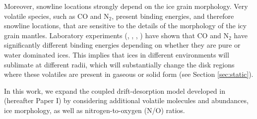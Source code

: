 \documentclass[apj]{emulateapj}
\begin{document}
Moreover, snowline locations strongly depend on the ice grain morphology. Very volatile species, such as CO and N$_2$, present binding energies, and therefore snowline locations, that are sensitive to the details of the morphology of the icy grain mantles. Laboratory experiments (\citealt{collings03}, \citealt{oberg05}, \citealt{bisschop06}, \citealt{fayolle16}) have shown that CO and N$_2$ have significantly different binding energies depending on whether they are pure or water dominated ices. This implies that ices in different environments will sublimate at different radii, which will substantially change the disk regions where these volatiles are present in gaseous or solid form (see Section \ref{sec:static}).  

 


In this work, we expand the coupled drift-desorption model developed in \citet{piso15b} (hereafter Paper I) by considering additional volatile molecules and abundances, ice morphology, as well as nitrogen-to-oxygen (N/O) ratios. 
\end{document}
